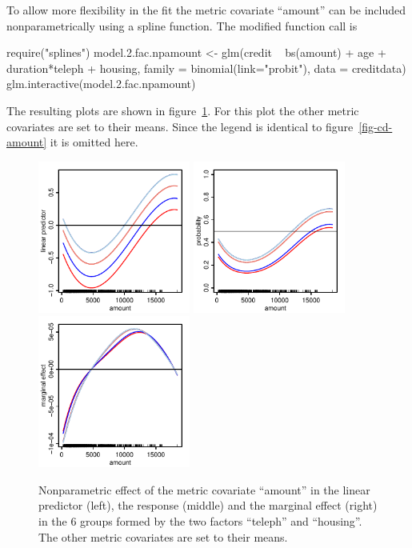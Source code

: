 \documentclass[nojss]{jss}
\newcommand{\quotes}[1]{``#1''}
\begin{document}
To allow more flexibility in the fit the metric covariate \quotes{amount} can  be included nonparametrically using a spline function. The modified function call is
%
\begin{Schunk}
\begin{Sinput}
 require("splines")
 model.2.fac.npamount <- glm(credit ~ bs(amount) + age + duration*teleph  
     + housing, family = binomial(link="probit"), data = creditdata)
 glm.interactive(model.2.fac.npamount) 
\end{Sinput}
\end{Schunk}
%
 
The resulting plots are shown in figure~\ref{fig-cd-amount-np}. For this plot the other metric covariates are set to their means.  Since the legend is identical to figure~\ref{fig-cd-amount} it is omitted here.

\begin{figure}[ht]
\centering
\includegraphics[width=5cm]{cd-amount-np-link-001} \includegraphics[width=5cm]{cd-amount-np-resp-001} \includegraphics[width=5cm]{cd-amount-np-marg-001}
\caption{Nonparametric effect of the metric covariate \quotes{amount} in the linear predictor (left), the response (middle) and the marginal effect (right) in the 6 groups formed by the two factors \quotes{teleph} and \quotes{housing}. The other metric covariates are set to their means.} \label{fig-cd-amount-np}
\end{figure} 
\end{document}
